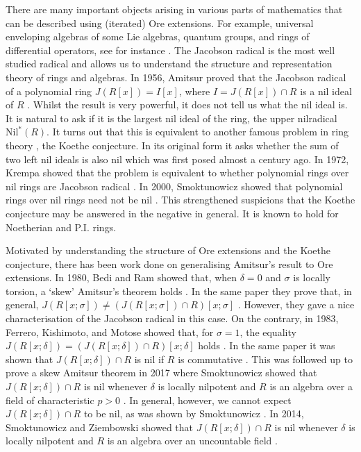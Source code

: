 \documentclass[12pt]{amsart}
\theoremstyle{definition}
\theoremstyle{definition}
\theoremstyle{definition}
\theoremstyle{remark}
\theoremstyle{definition}
\begin{document}
There are many important objects arising in various parts of mathematics that can be described using (iterated) Ore extensions. For example, universal enveloping algebras of some Lie algebras, quantum groups, and rings of differential operators, see for instance \cite[Prologue]{goodearl2004introduction}. The Jacobson radical is the most well studied radical and allows us to understand the structure and representation theory of rings and algebras. In 1956, Amitsur proved that the Jacobson radical of a polynomial ring $J(R[x]) = I[x]$, where $I = J(R[x])\cap R$ is a nil ideal of $R$ \cite{Amitsur_1956}. Whilst the result is very powerful, it does not tell us what the nil ideal is. It is natural to ask if it is the largest nil ideal of the ring, the upper nilradical $\text{Nil}^*(R)$. It turns out that this is equivalent to another famous problem in ring theory \cite[Exercise 10.25]{lam1991first}, the Koethe conjecture. In its original form it asks whether the sum of two left nil ideals is also nil \cite{Kothe1930} which was first posed almost a century ago. In 1972, Krempa showed that the problem is equivalent to whether polynomial rings over nil rings are Jacobson radical \cite[Theorem 2]{Krempa1972}. In 2000, Smoktunowicz showed that polynomial rings over nil rings need not be nil \cite{SMOKTUNOWICZ2000427}. This strengthened suspicions that the Koethe conjecture may be answered in the negative in general. It is known to hold for Noetherian and P.I. rings. 

Motivated by understanding the structure of Ore extensions and the Koethe conjecture, there has been work done on generalising Amitsur's result to Ore extensions. In 1980, Bedi and Ram showed that, when $\delta =0$ and $\sigma$ is locally torsion, a `skew' Amitsur's theorem holds \cite[Theorem 3.1]{Bedi1980}. In the same paper they prove that, in general, $J(R[x;\sigma]) \neq (J(R[x;\sigma])\cap R)[x;\sigma]$ \cite[Example 3.5]{Bedi1980}. However, they gave a nice characterisation of the Jacobson radical in this case. On the contrary, in 1983, Ferrero, Kishimoto, and Motose showed that, for $\sigma = 1$, the equality $J(R[x;\delta]) = (J(R[x;\delta])\cap R)[x;\delta]$ holds \cite[Theorem 3.2]{DiffPolyRadFerrero}. In the same paper it was shown that $J(R[x;\delta])\cap R$ is nil if $R$ is commutative \cite[Theorem 3.4]{DiffPolyRadFerrero}. This was followed up to prove a skew Amitsur theorem in 2017 where Smoktunowicz showed that $J(R[x;\delta])\cap R$ is nil whenever $\delta$ is locally nilpotent and $R$ is an algebra over a field of characteristic $p >0$ \cite[Theorem 2]{AgataHowFarCanWeGo}. In general, however, we cannot expect $J(R[x;\delta])\cap R$ to be nil, as was shown by Smoktunowicz \cite[Theorem 1]{AgataHowFarCanWeGo}. In 2014, Smoktunowicz and Ziembowski showed that $J(R[x;\delta])\cap R$ is nil whenever $\delta$ is locally nilpotent and $R$ is an algebra over an uncountable field \cite[Proposition 2.1]{SMOKTUNOWICZuncountablefield}. 
\end{document}
